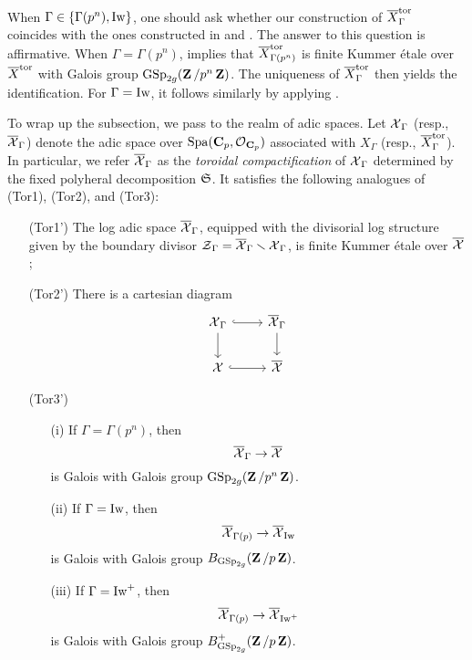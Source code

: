 \begin{Remark}\label{Remark: comparison of constructions of toroidal compactification}
\normalfont When $\Gamma \in \{\Gamma(p^n), \operatorname{Iw}\}$, one should ask whether our construction of $\overline{X}^{\operatorname{tor}}_{\Gamma}$ coincides with the ones constructed in \cite{Pilloni-Stroh-CoherentCohomologyandGaloisRepresentations} and \cite{Stroh-TorComp}. The answer to this question is affirmative. When $\Gamma = \Gamma(p^n)$, \cite[Chapter IV, Theorem 6.7(6)]{Faltings-Chai} implies that $\overline{X}_{\Gamma(p^n)}^{\operatorname{tor}}$ is finite Kummer \'etale over $\overline{X}^{\operatorname{tor}}$ with Galois group $\operatorname{GSp}_{2g}(\operatorname{\mathbf{Z}}/p^n\operatorname{\mathbf{Z}})$. The uniqueness of $\overline{X}^{\operatorname{tor}}_{\Gamma}$ then yields the identification. For $\Gamma = \operatorname{Iw}$, it follows similarly by applying \cite[Théorème 3.2.7.1]{Stroh-TorComp}. 
\end{Remark}

To wrap up the subsection, we pass to the realm of adic spaces. Let $\operatorname{\mathcal{X}}_{\Gamma}$ (resp., $\overline{\operatorname{\mathcal{X}}}_{\Gamma}$) denote the adic space over $\operatorname{Spa}(\operatorname{\mathbf{C}}_p, \operatorname{\mathcal{O}}_{\operatorname{\mathbf{C}}_p})$ associated with $X_{\Gamma}$ (resp., $\overline{X}^{\operatorname{tor}}_{\Gamma}$). In particular, we refer $\overline{\operatorname{\mathcal{X}}}_{\Gamma}$ as the \emph{toroidal compactification} of $\operatorname{\mathcal{X}}_{\Gamma}$ determined by the fixed polyheral decomposition $\operatorname{\mathfrak{S}}$. It satisfies the following analogues of (Tor1), (Tor2), and (Tor3):

\begin{enumerate}
    \item[(Tor1')] The log adic space $\overline{\operatorname{\mathcal{X}}}_{\Gamma}$, equipped with the divisorial log structure given by the boundary divisor $\operatorname{\mathcal{Z}}_{\Gamma} = \overline{\operatorname{\mathcal{X}}}_{\Gamma}\smallsetminus \operatorname{\mathcal{X}}_{\Gamma}$, is finite Kummer \'etale over $\overline{\operatorname{\mathcal{X}}}$; 
    \item[(Tor2')] There is a cartesian diagram \[
        \begin{tikzcd}
            \calX_{\Gamma} \arrow[r, hook]\arrow[d] & \overline{\calX}_{\Gamma}\arrow[d]\\
            \calX\arrow[r, hook] & \overline{\calX}
        \end{tikzcd}
    \]
    \item[(Tor3')] \begin{enumerate}
        \item[(i)] If $\Gamma = \Gamma(p^n)$, then \[
            \overline{\operatorname{\mathcal{X}}}_{\Gamma} \rightarrow \overline{\operatorname{\mathcal{X}}}
        \] is Galois with Galois group $\operatorname{GSp}_{2g}(\operatorname{\mathbf{Z}}/p^n\operatorname{\mathbf{Z}})$. 
        \item[(ii)] If $\Gamma = \operatorname{Iw}$, then \[
            \overline{\operatorname{\mathcal{X}}}_{\Gamma(p)} \rightarrow \overline{\operatorname{\mathcal{X}}}_{\operatorname{Iw}}
        \] is Galois with Galois group $B_{\operatorname{GSp}_{2g}}(\operatorname{\mathbf{Z}}/p\operatorname{\mathbf{Z}})$. 
        \item[(iii)] If $\Gamma = \operatorname{Iw}^+$, then \[
            \overline{\operatorname{\mathcal{X}}}_{\Gamma(p)} \rightarrow \overline{\operatorname{\mathcal{X}}}_{\operatorname{Iw}^+}
        \] is Galois with Galois group $B^+_{\operatorname{GSp}_{2g}}(\operatorname{\mathbf{Z}}/p\operatorname{\mathbf{Z}})$.
    \end{enumerate}
\end{enumerate}



